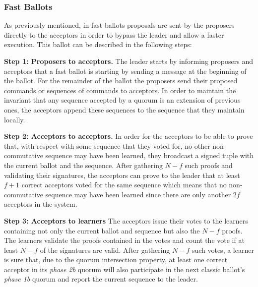 \subsubsection{Fast Ballots}
As previously mentioned, in fast ballots proposals are sent by the proposers directly to the acceptors in order to bypass the leader and allow a faster execution. This ballot can be described in the following steps:\par
\noindent\textbf{Step 1: Proposers to acceptors.} The leader starts by informing proposers and acceptors that a fast ballot is starting by sending a message at the beginning of the ballot. For the remainder of the ballot the proposers send their proposed commands or sequences of commands to acceptors. In order to maintain the invariant that any sequence accepted by a quorum is an extension of previous ones, the acceptors append these sequences to the sequence that they maintain locally.\par
\noindent\textbf{Step 2: Acceptors to acceptors.} In order for the acceptors to be able to prove that, with respect with some sequence that they voted for, no other non-commutative sequence may have been learned, they broadcast a signed tuple with the current ballot and the sequence. After gathering $N-f$ such proofs and validating their signatures, the acceptors can prove to the leader that at least $f+1$ correct acceptors voted for the same sequence which means that no non-commutative sequence may have been learned since there are only another $2f$ acceptors in the system.\par
\noindent\textbf{Step 3: Acceptors to learners} The acceptors issue their votes to the learners containing not only the current ballot and sequence but also the $N-f$ proofs. The learners validate the proofs contained in the votes and count the vote if at least $N-f$ of the signatures are valid. After gathering $N-f$ such votes, a learner is sure that, due to the quorum intersection property, at least one correct acceptor in its \textit{phase 2b} quorum will also participate in the next classic ballot's \textit{phase 1b} quorum and report the current sequence to the leader.

